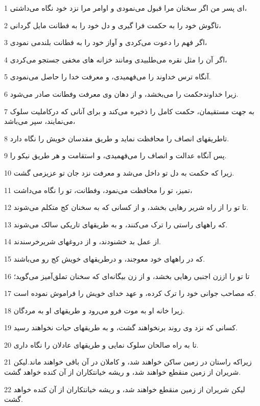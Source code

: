 \par 1 ای پسر من اگر سخنان مرا قبول می‌نمودی و اوامر مرا نزد خود نگاه می‌داشتی،
\par 2 تاگوش خود را به حکمت فرا گیری و دل خود را به فطانت مایل گردانی،
\par 3 اگر فهم را دعوت می‌کردی و آواز خود را به فطانت بلندمی نمودی،
\par 4 اگر آن را مثل نقره می‌طلبیدی ومانند خزانه های مخفی جستجو می‌کردی،
\par 5 آنگاه ترس خداوند را می‌فهمیدی، و معرفت خدا را حاصل می‌نمودی.
\par 6 زیرا خداوندحکمت را می‌بخشد، و از دهان وی معرفت وفطانت صادر می‌شود.
\par 7 به جهت مستقیمان، حکمت کامل را ذخیره می‌کند و برای آنانی که درکاملیت سلوک می‌نمایند، سپر می‌باشد،
\par 8 تاطریقهای انصاف را محافظت نماید و طریق مقدسان خویش را نگاه دارد.
\par 9 پس آنگاه عدالت و انصاف را می‌فهمیدی، و استقامت و هر طریق نیکو را.
\par 10 زیرا که حکمت به دل تو داخل می‌شد و معرفت نزد جان تو عزیزمی گشت.
\par 11 تمیز، تو را محافظت می‌نمود، وفطانت، تو را نگاه می‌داشت،
\par 12 تا تو را از راه شریر رهایی بخشد، و از کسانی که به سخنان کج متکلم می‌شوند.
\par 13 که راههای راستی را ترک می‌کنند، و به طریقهای تاریکی سالک می‌شوند.
\par 14 از عمل بد خشنودند، و از دروغهای شریرخرسندند.
\par 15 که در راههای خود معوجند، و درطریقهای خویش کج رو می‌باشند.
\par 16 تا تو را اززن اجنبی رهایی بخشد، و از زن بیگانه‌ای که سخنان تملق‌آمیز می‌گوید؛
\par 17 که مصاحب جوانی خود را ترک کرده، و عهد خدای خویش را فراموش نموده است.
\par 18 زیرا خانه او به موت فرو می‌رود و طریقهای او به مردگان.
\par 19 کسانی که نزد وی روند برنخواهند گشت، و به طریقهای حیات نخواهند رسید.
\par 20 تا به راه صالحان سلوک نمایی و طریقهای عادلان را نگاه داری.
\par 21 زیراکه راستان در زمین ساکن خواهند شد، و کاملان در آن باقی خواهند ماند.لیکن شریران از زمین منقطع خواهند شد، و ریشه خیانتکاران از آن کنده خواهد گشت.
\par 22 لیکن شریران از زمین منقطع خواهند شد، و ریشه خیانتکاران از آن کنده خواهد گشت.
 

